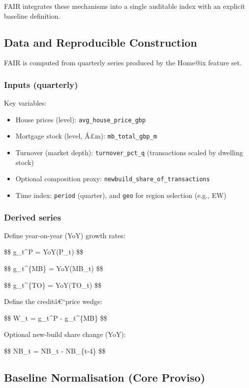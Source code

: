 FAIR integrates these mechanisms into a single auditable index with an
explicit baseline definition.

\subsection{Data and Reproducible
Construction}\label{data-and-reproducible-construction}

FAIR is computed from quarterly series produced by the Home@ix feature
set.

\subsubsection{Inputs (quarterly)}\label{inputs-quarterly-1}

Key variables:

\begin{itemize}
\tightlist
\item
  House prices (level): \texttt{avg\_house\_price\_gbp}
\item
  Mortgage stock (level, Â£m): \texttt{mb\_total\_gbp\_m}
\item
  Turnover (market depth): \texttt{turnover\_pct\_q} (transactions
  scaled by dwelling stock)
\item
  Optional composition proxy: \texttt{newbuild\_share\_of\_transactions}
\item
  Time index: \texttt{period} (quarter), and \texttt{geo} for region
  selection (e.g., EW)
\end{itemize}

\subsubsection{Derived series}\label{derived-series-1}

Define year-on-year (YoY) growth rates:

\$\$ g\_t\^{}P = YoY(P\_t) \$\$

\$\$ g\_t\^{}\{MB\} = YoY(MB\_t) \$\$

\$\$ g\_t\^{}\{TO\} = YoY(TO\_t) \$\$

Define the creditâ€``price wedge:

\$\$ W\_t = g\_t\^{}P - g\_t\^{}\{MB\} \$\$

Optional new-build share change (YoY):

\$\$ \Delta NB\_t = NB\_t - NB\_\{t-4\} \$\$

\subsection{Baseline Normalisation (Core
Proviso)}\label{baseline-normalisation-core-proviso-1}

